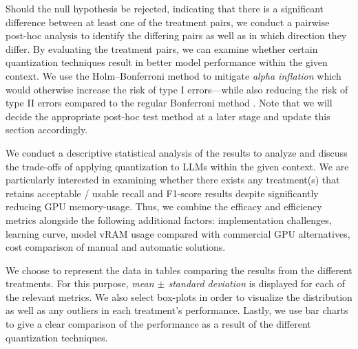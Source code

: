 \documentclass[conference]{IEEEtran}
\begin{document}

Should the null hypothesis be rejected, indicating that there is a significant difference between at least one of the treatment pairs, we conduct a pairwise post-hoc analysis to identify the differing pairs as well as in which direction they differ. By evaluating the treatment pairs, we can examine whether certain quantization techniques result in better model performance within the given context. 
We use the Holm–Bonferroni method to mitigate \textit{alpha inflation} which would otherwise increase the risk of type I errors---while also reducing the risk of type II errors compared to the regular Bonferroni method \cite{abdi2010HolmBonferroni}.
Note that we will decide the appropriate post-hoc test method at a later stage and update this section accordingly.

We conduct a descriptive statistical analysis of the results to analyze and discuss the trade-offs of applying quantization to LLMs within the given context. We are particularly interested in examining whether there exists any treatment(s) that retains acceptable / usable recall and F1-score results despite significantly reducing GPU memory-usage. Thus, we combine the efficacy and efficiency metrics alongside the following additional factors: implementation challenges, learning curve, model vRAM usage compared with commercial GPU alternatives, cost comparison of manual and automatic solutions. 

We choose to represent the data in tables comparing the results from the different treatments. For this purpose, \textit{mean $\pm$ standard deviation} is displayed for each of the relevant metrics. We also select box-plots in order to visualize the distribution as well as any outliers in each treatment's performance. Lastly, we use bar charts to give a clear comparison of the performance as a result of the different quantization techniques.
\end{document}
